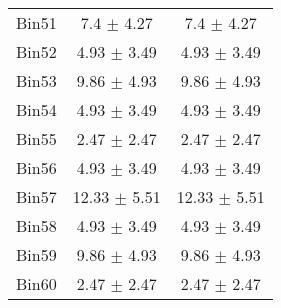 \begin{tabular}{|c|c|c|}
     Bin51 & 7.4 $\pm$ 4.27 & 7.4 $\pm$ 4.27 \\ \cline{1-3} 
     Bin52 & 4.93 $\pm$ 3.49 & 4.93 $\pm$ 3.49 \\ \cline{1-3} 
     Bin53 & 9.86 $\pm$ 4.93 & 9.86 $\pm$ 4.93 \\ \cline{1-3} 
     Bin54 & 4.93 $\pm$ 3.49 & 4.93 $\pm$ 3.49 \\ \cline{1-3} 
     Bin55 & 2.47 $\pm$ 2.47 & 2.47 $\pm$ 2.47 \\ \cline{1-3} 
     Bin56 & 4.93 $\pm$ 3.49 & 4.93 $\pm$ 3.49 \\ \cline{1-3} 
     Bin57 & 12.33 $\pm$ 5.51 & 12.33 $\pm$ 5.51 \\ \cline{1-3} 
     Bin58 & 4.93 $\pm$ 3.49 & 4.93 $\pm$ 3.49 \\ \cline{1-3} 
     Bin59 & 9.86 $\pm$ 4.93 & 9.86 $\pm$ 4.93 \\ \cline{1-3} 
     Bin60 & 2.47 $\pm$ 2.47 & 2.47 $\pm$ 2.47 \\ \cline{1-3} 
  \end{tabular}
